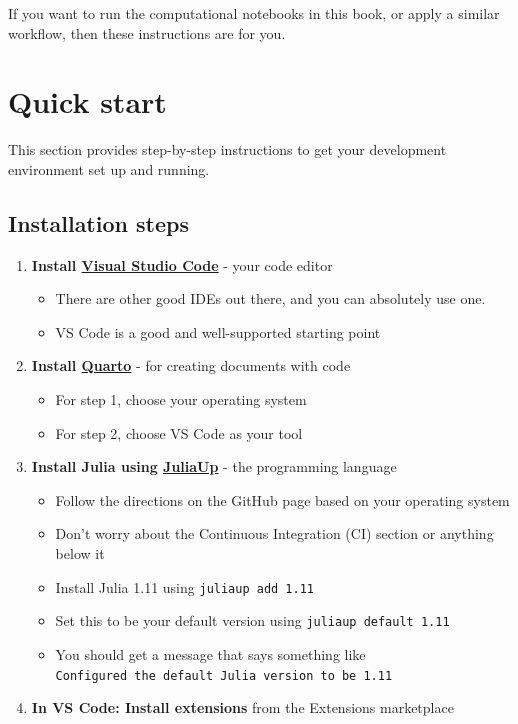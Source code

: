 \documentclass[
  letterpaper,
  DIV=11,
  numbers=noendperiod]{scrreprt}
\providecommand{\tightlist}{%
  \setlength{\itemsep}{0pt}\setlength{\parskip}{0pt}}
\begin{document}
If you want to run the computational notebooks in this book, or apply a
similar workflow, then these instructions are for you.

\section{Quick start}\label{quick-start}

This section provides step-by-step instructions to get your development
environment set up and running.

\subsection{Installation steps}\label{installation-steps}

\begin{enumerate}
\def\labelenumi{\arabic{enumi}.}
\tightlist
\item
  \textbf{Install \href{https://code.visualstudio.com/download}{Visual
  Studio Code}} - your code editor

  \begin{itemize}
  \tightlist
  \item
    There are other good IDEs out there, and you can absolutely use one.
  \item
    VS Code is a good and well-supported starting point
  \end{itemize}
\item
  \textbf{Install \href{https://quarto.org/docs/get-started/}{Quarto}} -
  for creating documents with code

  \begin{itemize}
  \tightlist
  \item
    For step 1, choose your operating system
  \item
    For step 2, choose VS Code as your tool
  \end{itemize}
\item
  \textbf{Install Julia using
  \href{https://github.com/JuliaLang/juliaup}{JuliaUp}} - the
  programming language

  \begin{itemize}
  \tightlist
  \item
    Follow the directions on the GitHub page based on your operating
    system
  \item
    Don't worry about the Continuous Integration (CI) section or
    anything below it
  \item
    Install Julia 1.11 using \texttt{juliaup\ add\ 1.11}
  \item
    Set this to be your default version using
    \texttt{juliaup\ default\ 1.11}
  \item
    You should get a message that says something like
    \texttt{Configured\ the\ default\ Julia\ version\ to\ be\ \textquotesingle{}1.11\textquotesingle{}}
  \end{itemize}
\item
  \textbf{In VS Code: Install extensions} from the Extensions
  marketplace


\end{enumerate}
\end{document}
